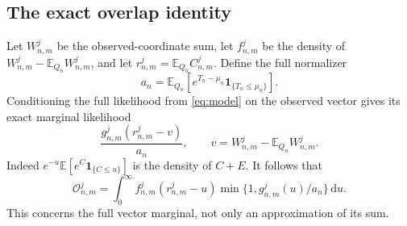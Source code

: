 \documentclass[11pt,oneside]{article}
\theoremstyle{remark}\newtheorem{remark}[theorem]{Remark}
\newcommand{\E}{\mathbb E}
\newcommand{\dd}{\,\mathrm d}
\newcommand{\ind}{\mathbf 1}
\newcommand{\OO}{\mathcal O}
\numberwithin{equation}{section}
\begin{document}
\subsection{The exact overlap identity}
Let $W^j_{n,m}$ be the observed-coordinate sum, let $f^j_{n,m}$ be the
density of $W^j_{n,m}-\E_{Q_n}W^j_{n,m}$, and let
$r^j_{n,m}=\E_{Q_n}C^j_{n,m}$. Define the full normalizer
\begin{equation}
 a_n=\E_{Q_n}\!\left[e^{T_n-\mu_n}\ind_{\{T_n\le\mu_n\}}\right].
\end{equation}
Conditioning the full likelihood from \eqref{eq:model} on the observed
vector gives its exact marginal likelihood
\begin{equation}
 \frac{g^j_{n,m}(r^j_{n,m}-v)}{a_n},
 \qquad v=W^j_{n,m}-\E_{Q_n}W^j_{n,m}.
\end{equation}
Indeed $e^{-u}\E[e^{C}\ind_{\{C\le u\}}]$ is the density of $C+E$.
It follows that
\begin{equation}
 \OO^j_{n,m}=\int_0^\infty f^j_{n,m}(r^j_{n,m}-u)
           \min\{1,g^j_{n,m}(u)/a_n\}\dd u.
 \label{eq:exactoverlap}
\end{equation}
This concerns the full vector marginal, not only an approximation of its sum.
\end{document}

